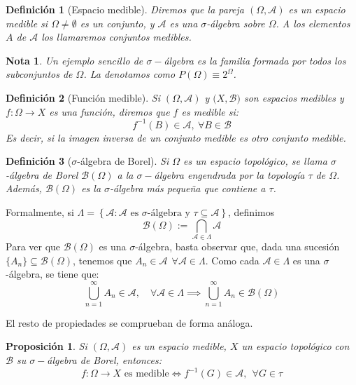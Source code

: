 \documentclass[11pt, a4paper]{article}
\theoremstyle{theorem-style}
\newtheorem{nprop}{Proposición}[section]
\theoremstyle{definition-style}
\newtheorem{ndef}{Definición}[section]
\theoremstyle{remark-style}
\newtheorem*{nota}{Nota}
\theoremstyle{example-style}
\begin{document}
\begin{ndef}[Espacio medible] Diremos que la pareja $(\Omega, \mathcal A)$ es un espacio medible si $\Omega \ne \emptyset$ es un conjunto, y $\mathcal A$ es una $\sigma$-álgebra sobre $\Omega$. A los elementos $A$ de $\mathcal{A}$ los llamaremos conjuntos medibles.
\end{ndef}

\begin{nota}
  Un ejemplo sencillo de $\sigma-$álgebra es la familia formada por todos los subconjuntos de $\Omega$. La denotamos como $P(\Omega) \equiv 2^\Omega$.
\end{nota}

\begin{ndef}[Función medible]
  Si $(\Omega,\mathcal{A}) $ y $(X,\mathcal{B)}$ son espacios medibles y \mbox{$f: \Omega \to X$} es una función, diremos que $f$ es medible si:
  \[
    f^{-1}(B) \in \mathcal A, \ \forall B \in \mathcal{B}
  \]
  Es decir, si la imagen inversa de un conjunto medible es otro conjunto medible.
\end{ndef}

\begin{ndef}[$\sigma$-álgebra de Borel] Si $\Omega$ es un espacio topológico, se llama $\sigma$-álgebra de Borel $\mathcal B(\Omega)$ a la $\sigma-$álgebra engendrada por la topología $\tau$ de $\Omega$. Además, $\mathcal B(\Omega)$ es la $\sigma$-álgebra más pequeña que contiene a $\tau$.
\end{ndef}

Formalmente, si $\Lambda = \left\{ \mathcal A : \mathcal A \text{ es } \sigma \text{-álgebra y } \tau \subseteq \mathcal A \right\}$, definimos $$\mathcal B(\Omega) := \bigcap_{\mathcal A \in \Lambda} \mathcal A$$ 
Para ver que $\mathcal B(\Omega)$ es una $\sigma$-álgebra, basta observar que, dada una sucesión \mbox{$\{A_n\} \subseteq \mathcal B(\Omega)$}, tenemos que $A_n \in \mathcal A \ \ \forall \mathcal A \in \Lambda$. Como cada $\mathcal A \in \Lambda$ es una $\sigma$-álgebra, se tiene que: $$\bigcup_{n=1}^\infty A_n \in \mathcal A, \quad \forall \mathcal A \in \Lambda \implies \bigcup_{n=1}^\infty A_n \in \mathcal B(\Omega)$$

El resto de propiedades se comprueban de forma análoga.

\begin{nprop}Si $(\Omega,\mathcal{A})$ es un espacio medible, $X$ un espacio topológico con $\mathcal B$ su $\sigma-$álgebra de Borel, entonces:
  \[
    f: \Omega \to X \text{ es medible} \iff f^{-1}(G) \in \mathcal{A}, \ \ \forall G \in \tau
  \]

\end{nprop}
\end{document}
